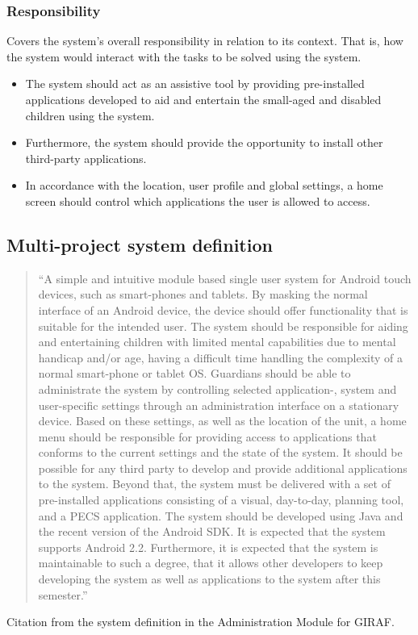 \subsubsection{Responsibility} 
Covers the system's overall responsibility in relation to its context. That is, how the system would interact with the tasks to be solved using the system.
\begin{itemize}
	\item The system should act as an assistive tool by providing pre-installed applications developed to aid and entertain the small-aged and disabled children using the system. 
	\item Furthermore, the system should provide the opportunity to install other third-party applications. 
	\item In accordance with the location, user profile and global settings, a home screen should control which applications the user is allowed to access.
\end{itemize}

\subsection{Multi-project system definition}

\begin{quotation}
``A simple and intuitive module based single user system for Android touch devices, such as smart-phones and tablets. By masking the normal interface of an Android device, the device should offer functionality that is suitable for the intended user.
The system should be responsible for aiding and entertaining children with limited mental capabilities due to mental handicap and/or age, having a difficult time handling the complexity of a normal smart-phone or tablet OS. Guardians should be able to administrate the system by controlling selected application-, system and user-specific settings through an administration interface on a stationary device. Based on these settings, as well as the location of the unit, a home menu should be responsible for providing access to applications that conforms to the current settings and the state of the system. It should be possible for any third party to develop and provide additional applications to the system. Beyond that, the system must be delivered with a set of pre-installed applications consisting of a visual, day-to-day, planning tool, and a PECS application. The system should be developed using Java and the recent version of the Android SDK. It is expected that the system supports Android 2.2. Furthermore, it is expected that the system is maintainable to such a degree, that it allows other developers to keep developing the system as well as applications to the system after this semester.''
\end{quotation}
Citation from the system definition in the Administration Module for GIRAF.\cite{giraffactors}

